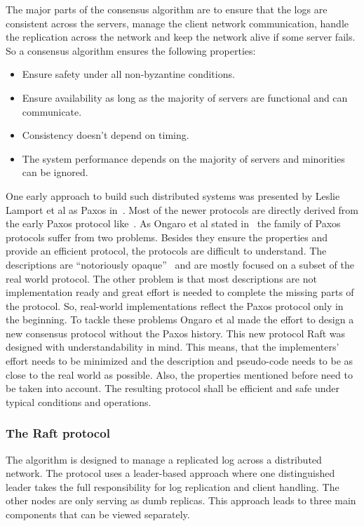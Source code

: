 The major parts of the consensus algorithm are to ensure that the logs are
consistent across the servers, manage the client network communication,
handle the replication across the network and keep the network alive if
some server fails. So a consensus algorithm ensures the following properties:~\cite{ongaro2014search}

\begin{itemize}
\item Ensure safety under all non-byzantine conditions.
\item Ensure availability as long as the majority of servers are
  functional and can communicate.
\item Consistency doesn't depend on timing.
\item The system performance depends on the majority of servers
  and minorities can be ignored.
\end{itemize}

One early approach to build such distributed systems was presented by
Leslie Lamport et al as Paxos in~\cite{lamport1978time}.
Most of the newer protocols are directly derived from the early Paxos
protocol like~\cite{lamport2001paxos, van2015paxos}.
As Ongaro et al stated in~\cite{ongaro2014search} the family of
Paxos protocols suffer from two problems. Besides they ensure the
properties and provide an efficient protocol, the protocols are
difficult to understand. The descriptions are ``notoriously
opaque''~\cite{ongaro2014search} and are mostly focused on a
subset of the real world protocol. The other problem is that
most descriptions are not implementation ready and great effort
is needed to complete the missing parts of the protocol.
So, real-world implementations reflect the Paxos protocol only in
the beginning. To tackle these problems Ongaro et al made
the effort to design a new consensus protocol without the
Paxos history. This new protocol Raft was designed with
understandability in mind. This means, that the implementers'
effort needs to be minimized and the description and pseudo-code
needs to be as close to the real world as possible. Also,
the properties mentioned before need to be taken into account.
The resulting protocol shall be efficient and safe under
typical conditions and operations.~\cite{ongaro2014search}

\subsubsection*{The Raft protocol}
The algorithm is designed to manage a replicated log
across a distributed network. The protocol uses a leader-based
approach where one distinguished leader takes the full responsibility
for log replication and client handling. The other nodes are
only serving as dumb replicas. This approach
leads to three main components that can be viewed separately.~\cite{ongaro2014search}

